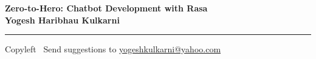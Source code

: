 
\graphicspath{{images/}}

\footnotesize


\begin{center}
\Large{\textbf{Zero-to-Hero: Chatbot Development with Rasa\\ Yogesh Haribhau Kulkarni}}  
\end{center}

\begin{multicols}{2}

\end{multicols}

\rule{\linewidth}{0.25pt}
\scriptsize
Copyleft \textcopyleft\  Send suggestions to 
\href{http://www.yogeshkulkarni.com}{yogeshkulkarni@yahoo.com}


